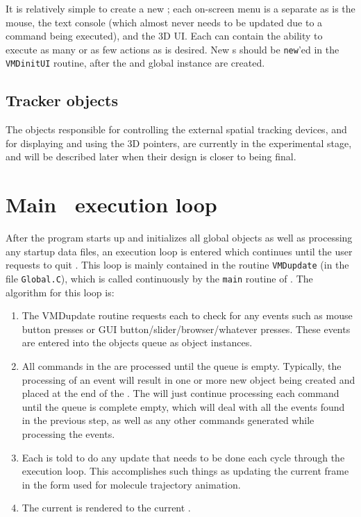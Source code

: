It is relatively simple to create a new ; each on-screen menu is a separate  as is the mouse, the text console (which almost never needs to be updated due to a command being executed), and the 3D UI.  Each  can contain the ability to execute as many or as few actions as is desired.  New s should be {\tt new}'ed in the {\tt VMDinitUI} routine, after the and  global instance are created.

\subsection{Tracker objects}

The objects responsible for controlling the external spatial tracking devices, and for displaying and using the 3D pointers, are currently in the experimental stage, and will be described later when their design is closer to being final.


\section{Main \VMD\ execution loop}
\label{section:pg:mainloop}

After the program starts up and initializes all global objects as well as processing any startup data files, an execution loop is entered which continues until the user requests to quit \VMD.  This loop is mainly contained in the routine {\tt VMDupdate} (in the file {\tt Global.C}), which is called continuously by the {\tt main} routine of \VMD.  The algorithm for this loop is:
\begin{enumerate}
  \item The VMDupdate routine requests each  to check for any events such as mouse button presses or GUI button/slider/browser/whatever presses.  These events are entered into the  objects queue as  object instances.
  \item All commands in the  are processed until the queue is empty.  Typically, the processing of an event will result in one or more new  object being created and placed at the end of the .  The  will just continue processing each command until the queue is complete empty, which will deal with all the events found in the previous step, as well as any other commands generated while processing the events.
  \item Each  is told to do any update that needs to be done each cycle through the execution loop.  This accomplishes such things as updating the current frame in the form used for molecule trajectory animation.
  \item The current  is rendered to the current .
\end{enumerate}


